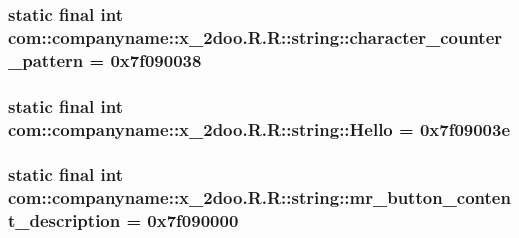 \hypertarget{classcom_1_1companyname_1_1x__2doo_1_1_r_1_1string_5eb3fb2991556f11a1af0fda49b69174}{
\subsubsection[{character\_\-counter\_\-pattern}]{\setlength{\rightskip}{0pt plus 5cm}static final int com::companyname::x\_\-2doo.R.R::string::character\_\-counter\_\-pattern = 0x7f090038}}
\label{classcom_1_1companyname_1_1x__2doo_1_1_r_1_1string_5eb3fb2991556f11a1af0fda49b69174}


\hypertarget{classcom_1_1companyname_1_1x__2doo_1_1_r_1_1string_d93f30488c1814926ca0f4b419e0cdfc}{
\subsubsection[{Hello}]{\setlength{\rightskip}{0pt plus 5cm}static final int com::companyname::x\_\-2doo.R.R::string::Hello = 0x7f09003e}}
\label{classcom_1_1companyname_1_1x__2doo_1_1_r_1_1string_d93f30488c1814926ca0f4b419e0cdfc}


\hypertarget{classcom_1_1companyname_1_1x__2doo_1_1_r_1_1string_f4f84ee8649aaab255f816f3daf0d78a}{
\subsubsection[{mr\_\-button\_\-content\_\-description}]{\setlength{\rightskip}{0pt plus 5cm}static final int com::companyname::x\_\-2doo.R.R::string::mr\_\-button\_\-content\_\-description = 0x7f090000}}
\label{classcom_1_1companyname_1_1x__2doo_1_1_r_1_1string_f4f84ee8649aaab255f816f3daf0d78a}


